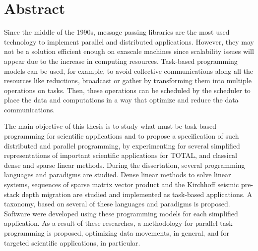 \chapter*{Abstract}

Since the middle of the 1990s, message passing libraries are the most used technology to implement parallel and distributed applications.
However, they may not be a solution efficient enough on exascale machines since scalability issues will appear due to the increase in computing resources.
Task-based programming models can be used, for example, to avoid collective communications along all the resources like reductions, broadcast or gather by transforming them into multiple operations on tasks.
Then, these operations can be scheduled by the scheduler to place the data and computations in a way that optimize and reduce the data communications.

The main objective of this thesis is to study what must be task-based programming for scientific applications and to propose a specification of such distributed and parallel programming, by experimenting for several simplified representations of important scientific applications for TOTAL, and classical dense and sparse linear methods.
During the dissertation, several programming languages and paradigms are studied.
Dense linear methods to solve linear systems, sequences of sparse matrix vector product and the Kirchhoff seismic pre-stack depth migration are studied and implemented as task-based applications.
A taxonomy, based on several of these languages and paradigms is proposed.
Software were developed using these programming models for each simplified application.
As a result of these researches, a methodology for parallel task programming is proposed, optimizing data movements, in general, and for targeted scientific applications, in particular.
